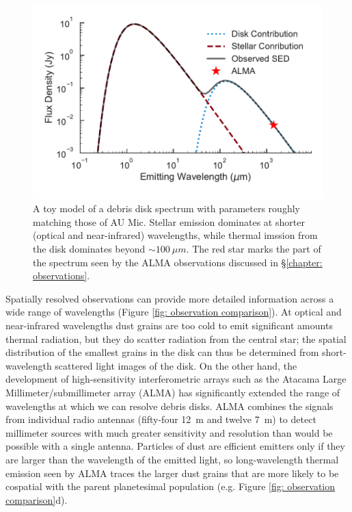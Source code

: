 \documentclass[12pt,oneside]{book}
\begin{document}
\begin{figure}[!ht]
  \includegraphics[width=\linewidth]{../figures/disk_SED}
  \caption{
  A toy model of a debris disk spectrum with parameters roughly matching those of AU Mic. 
  Stellar emission dominates at shorter (optical and near-infrared) wavelengths, while thermal imssion from the disk dominates beyond $\sim \SI{100}{\mu m}$.
  The red star marks the part of the spectrum seen by the ALMA observations discussed in \S \ref{chapter: observations}.
  }
  \label{fig: SED}
\end{figure}

Spatially resolved observations can provide more detailed information across a wide range of wavelengths (Figure \ref{fig: observation comparison}).
At optical and near-infrared wavelengths dust grains are too cold to emit significant amounts thermal radiation, but they do scatter radiation from the central star; the spatial distribution of the smallest grains in the disk can thus be determined from short-wavelength scattered light images of the disk.
On the other hand, the development of high-sensitivity interferometric arrays such as the Atacama Large Millimeter/submillimeter array (ALMA) has significantly extended the range of wavelengths at which we can resolve debris disks.
ALMA combines the signals from individual radio antennas (fifty-four \SI{12}{m} and twelve \SI{7}{m}) to detect millimeter sources with much greater sensitivity and resolution than would be possible with a single antenna.
Particles of dust are efficient emitters only if they are larger than the wavelength of the emitted light, so long-wavelength thermal emission seen by ALMA traces the larger dust grains that are more likely to be cospatial with the parent planetesimal population (e.g. Figure \ref{fig: observation comparison}d).
\end{document}
